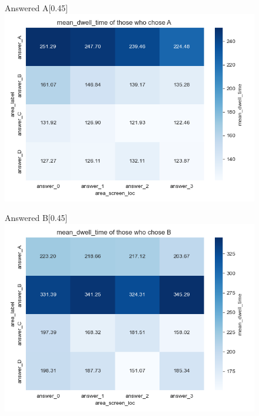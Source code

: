 \documentclass{article}
\begin{document}
        
        \begin{figure}[H]
          \centering
          \begin{subcaptionbox}{Answered A\label{fig:a5}}[0.45\textwidth]
            {\centering\includegraphics[width=\linewidth]{plots/matrix_plots/matrix_mean_dwell_time_A_hunters.png}}
          \end{subcaptionbox}
          \hfill
          \begin{subcaptionbox}{Answered B\label{fig:b5}}[0.45\textwidth]
            {\centering\includegraphics[width=\linewidth]{plots/matrix_plots/matrix_mean_dwell_time_B_hunters.png}}
          \end{subcaptionbox}
          

\end{figure}
\end{document}

